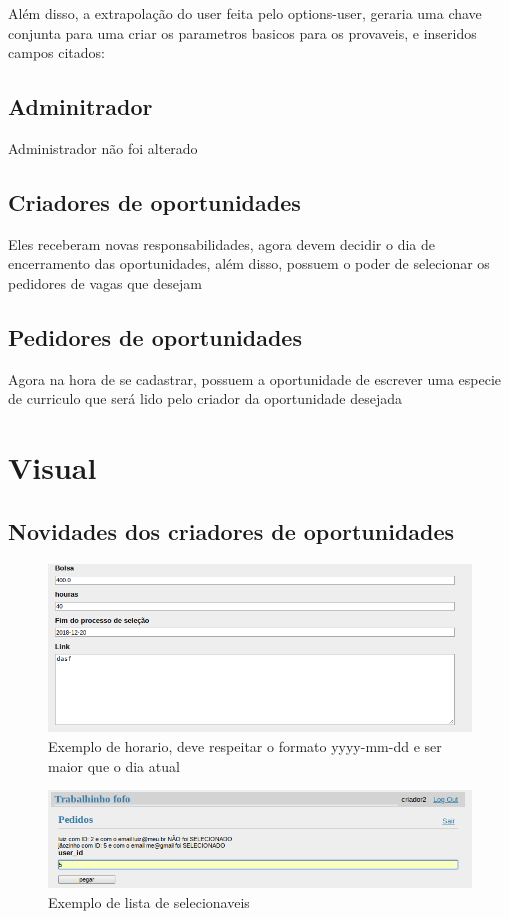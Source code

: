 \documentclass[12pt]{article}
\begin{document}
Além disso, a extrapolação do user feita pelo options-user, geraria uma chave conjunta para uma criar os parametros basicos
para os provaveis, e inseridos campos citados:

\subsection{Adminitrador}

Administrador não foi alterado

\subsection{Criadores de oportunidades}

Eles receberam novas responsabilidades, agora devem decidir o dia de encerramento das oportunidades, além disso,
possuem o poder de selecionar os pedidores de vagas que desejam

\subsection{Pedidores de oportunidades}

Agora na hora de se cadastrar, possuem a oportunidade de escrever uma especie de curriculo que será lido pelo criador
da oportunidade desejada


\section{Visual}\label{sec:figs}


\subsection{Novidades dos criadores de oportunidades }

\begin{figure}[ht]
\centering
\includegraphics[width=.5\textwidth]{imagens/horarios.png}
\caption{Exemplo de horario, deve respeitar o formato yyyy-mm-dd e ser maior que o dia atual}
\end{figure}

\begin{figure}[ht]
\centering
\includegraphics[width=.5\textwidth]{imagens/selecao.png}
\caption{Exemplo de lista de selecionaveis}
\end{figure}
\end{document}
